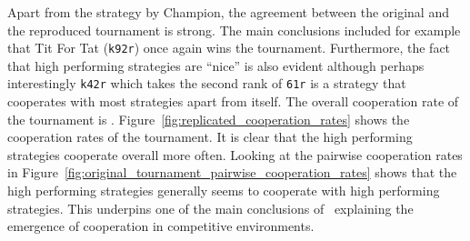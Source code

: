 \documentclass{article}
\begin{document}
Apart from the strategy by Champion, the agreement between the original and the
reproduced tournament is strong. The main conclusions included for example that
Tit For Tat (\texttt{k92r}) once again wins the tournament. Furthermore, the
fact that high performing strategies are ``nice'' is also evident although
perhaps interestingly \texttt{k42r} which takes the second rank of \texttt{61r}
is a strategy that cooperates with most strategies apart from itself.  The
overall cooperation rate of the tournament is
.
Figure~\ref{fig:replicated_cooperation_rates} shows the cooperation rates of
the tournament. It is clear that the high performing strategies cooperate
overall more often. Looking at the pairwise cooperation rates in
Figure~\ref{fig:original_tournament_pairwise_cooperation_rates} shows that the
high performing strategies generally seems to cooperate with high performing
strategies. This underpins one of the main conclusions of~\cite{Axelrod1980b}
explaining the emergence of cooperation in competitive environments.
\end{document}
